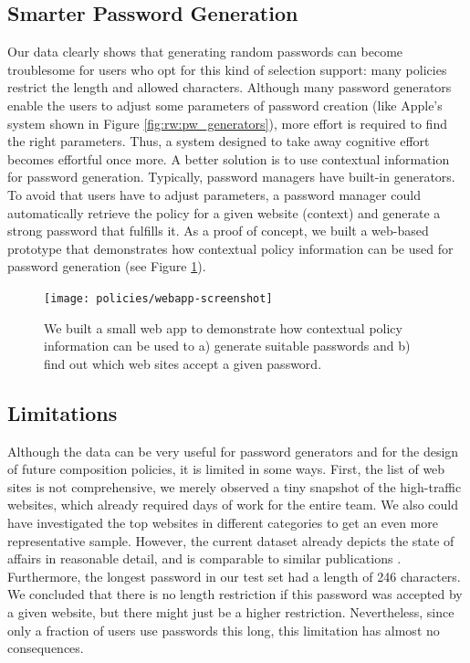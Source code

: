\subsection{Smarter Password Generation}
Our data clearly shows that generating random passwords can become troublesome for users who opt for this kind of selection support: many policies restrict the length and allowed characters. Although many password generators enable the users to adjust some parameters of password creation (like Apple's system shown in Figure \ref{fig:rw:pw_generators}), more effort is required to find the right parameters. Thus, a system designed to take away cognitive effort becomes effortful once more. A better solution is to use contextual information for password generation. Typically, password managers have built-in generators. To avoid that users have to adjust parameters, a password manager could automatically retrieve the policy for a given website (context) and generate a strong password that fulfills it. As a proof of concept, we built a web-based prototype that demonstrates how contextual policy information can be used for password generation (see Figure \ref{fig:policies_reuse:webapp}). 

\begin{figure}
	\centering
	\texttt{[image: policies/webapp-screenshot]}
	\caption{\label{fig:policies_reuse:webapp}We built a small web app to demonstrate how contextual policy information can be used to a) generate suitable passwords and b) find out which web sites accept a given password.}
\end{figure}

\subsection{Limitations}
Although the data can be very useful for password generators and for the design of future composition policies, it is limited in some ways. 
First, the list of web sites is not comprehensive, we merely observed a tiny snapshot of the high-traffic websites, which already required days of work for the entire team. We also could have investigated the top websites in different categories to get an even more representative sample. However, the current dataset already depicts the state of affairs in reasonable detail, and is comparable to similar publications \cite{Florencio2010WhereDoPoliciesComeFrom, Wang2015EmperorsPolicies}. 
Furthermore, the longest password in our test set had a length of 246 characters. We concluded that there is no length restriction if this password was accepted by a given website, but there might just be a higher restriction. Nevertheless, since only a fraction of users use passwords this long, this limitation has almost no consequences.

